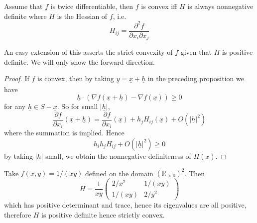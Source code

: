 \begin{proposition}
    Assume that $f$ is twice differentiable, then $f$ is convex iff $H$ is always nonnegative definite where $H$ is the Hessian of $f$, i.e.
    $$H_{ij}=\frac{\partial^2f}{\partial x_i\partial x_j}$$
\end{proposition}
An easy extension of this asserts the strict convexity of $f$ given that $H$ is positive definite.
We will only show the forward direction.
\begin{proof}
    If $f$ is convex, then by taking $\underline{y}=\underline{x}+\underline{h}$ in the preceding proposition we have
    $$\underline{h}\cdot(\nabla f(\underline{x}+\underline{h})-\nabla f(\underline{x}))\ge 0$$
    for any $\underline{h}\in S-\underline{x}$.
    So for small $|\underline{h}|$,
    $$\frac{\partial f}{\partial x_i}(\underline{x}+\underline{h})=\frac{\partial f}{\partial x_i}(\underline{x})+h_jH_{ij}(\underline{x})+O(|\underline{h}|^2)$$
    where the summation is implied.
    Hence
    $$h_ih_jH_{ij}+O(|\underline{h}|^2)\ge 0$$
    by taking $|\underline{h}|$ small, we obtain the nonnegative definiteness of $H(\underline{x})$.
\end{proof}
\begin{example}
    Take $f(x,y)=1/(xy)$ defined on the domain $(\mathbb R_{>0})^2$.
    Then
    $$H=\frac{1}{xy}\begin{pmatrix}
        2/x^2&1/(xy)\\
        1/(xy)&2/y^2
    \end{pmatrix}$$
    which has positive determinant and trace, hence its eigenvalues are all positive, therefore $H$ is positive definite hence strictly convex.
\end{example}
